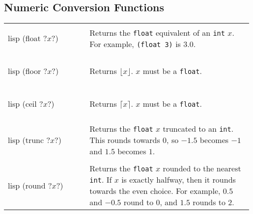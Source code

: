 \documentclass[a4paper, 12pt]{article}
\makeatletter
\newenvironment{funcdefs}
    {\begin{longtable}{@{} x{0.33\linewidth} @{} >{\raggedright\arraybackslash}p{0.66\linewidth} @{}}}
    {\end{longtable}}
\makeatother
\begin{document}
\subsection{Numeric Conversion Functions}
\begin{funcdefs}
    \begin{minipage}[t]{\linewidth}
        \centering
        \begin{cminted}[autogobble=true, escapeinside=??]{lisp}
            (float ?$x$?)
        \end{cminted}
    \end{minipage}
    & Returns the \texttt{float} equivalent of an \texttt{int} $x$. For example, \texttt{(float 3)} is $3.0$.
    \\ \\
    \begin{minipage}[t]{\linewidth}
        \centering
        \begin{cminted}[autogobble=true, escapeinside=??]{lisp}
            (floor ?$x$?)
        \end{cminted}
    \end{minipage}
    & Returns $\lfloor x \rfloor$. $x$ must be a \texttt{float}.
    \\ \\
    \begin{minipage}[t]{\linewidth}
        \centering
        \begin{cminted}[autogobble=true, escapeinside=??]{lisp}
            (ceil ?$x$?)
        \end{cminted}
    \end{minipage}
    & Returns $\lceil x \rceil$. $x$ must be a \texttt{float}.
    \\ \\
    \begin{minipage}[t]{\linewidth}
        \centering
        \begin{cminted}[autogobble=true, escapeinside=??]{lisp}
            (trunc ?$x$?)
        \end{cminted}
    \end{minipage}
    & Returns the \texttt{float} $x$ truncated to an \texttt{int}. This rounds towards 0, so $-1.5$ becomes $-1$ and $1.5$ becomes $1$.
    \\ \\
    \begin{minipage}[t]{\linewidth}
        \centering
        \begin{cminted}[autogobble=true, escapeinside=??]{lisp}
            (round ?$x$?)
        \end{cminted}
    \end{minipage}
    & Returns the \texttt{float} $x$ rounded to the nearest \texttt{int}. If $x$ is exactly halfway, then it rounds towards the even choice. For example, $0.5$ and $-0.5$ round to $0$, and $1.5$ rounds to 2.
\end{funcdefs}
\end{document}
